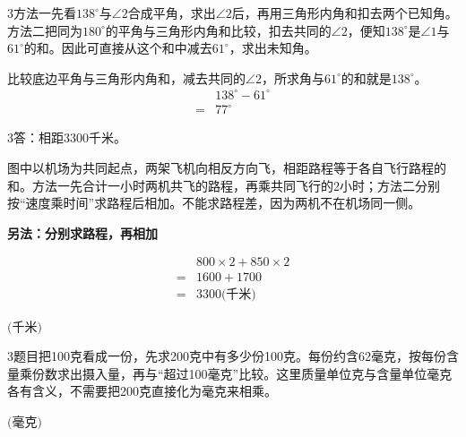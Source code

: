 \documentclass[multi=snippet,border={5bp 20bp 5bp 5bp}]{standalone}
\newenvironment{snippet}[3]{\begin{minipage}{#1bp}\color{answerred}\fontsize{#2}{#3}\selectfont\raggedright}{\end{minipage}}
\begin{document}
\begin{snippet}{505}{11.5}{14}\begin{multicols}{3}\raggedcolumns 方法一先看\(138^\circ\)\allowbreak 与\(\angle2\)\allowbreak 合成平角，求出\(\angle2\)\allowbreak 后，再用三角形内角和扣去两个已知角。方法二把同为\(180^\circ\)\allowbreak 的平角与三角形内角和比较，扣去共同的\(\angle2\)\allowbreak ，便知\(138^\circ\)\allowbreak 是\(\angle1\)\allowbreak 与\(61^\circ\)\allowbreak 的和。因此可直接从这个和中减去\(61^\circ\)\allowbreak ，求出未知角。\par 比较底边平角与三角形内角和，减去共同的\(\angle2\)\allowbreak ，所求角与\(61^\circ\)\allowbreak 的和就是\(138^\circ\)\allowbreak 。\[\begin{aligned}&138^\circ-61^\circ\\={}&77^\circ\end{aligned}\]\end{multicols}\end{snippet}
\begin{snippet}{505}{11.5}{14}\begin{multicols}{3}\raggedcolumns 答：相距3300千米。\par 图中以机场为共同起点，两架飞机向相反方向飞，相距路程等于各自飞行路程的和。方法一先合计一小时两机共飞的路程，再乘共同飞行的2小时；方法二分别按“速度乘时间”求路程后相加。不能求路程差，因为两机不在机场同一侧。\par \textbf{另法：分别求路程，再相加}\par \[\begin{aligned}&800\times2+850\times2\\={}&1600+1700\\={}&3300\text{(千米)}\end{aligned}\]\end{multicols}\end{snippet}
\begin{snippet}{80}{9.5}{14}\SourceSans\setlength{\mathindent}{2bp}\(\text{(千米)}\)\end{snippet}
\begin{snippet}{505}{11.5}{14}\begin{multicols}{3}\raggedcolumns 题目把100克看成一份，先求200克中有多少份100克。每份约含62毫克，按每份含量乘份数求出摄入量，再与“超过100毫克”比较。这里质量单位克与含量单位毫克各有含义，不需要把200克直接化为毫克来相乘。\end{multicols}\end{snippet}
\begin{snippet}{80}{9.5}{14}\SourceSans\setlength{\mathindent}{2bp}\(\text{(毫克)}\)\end{snippet}
\end{document}
